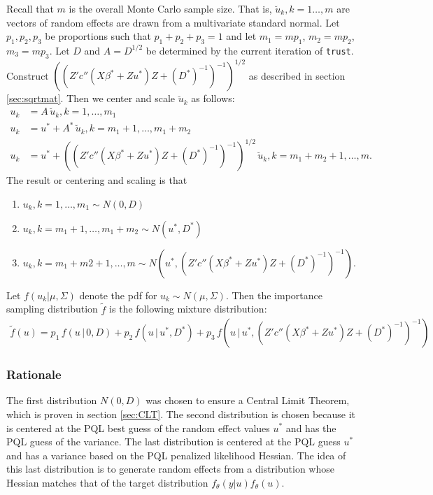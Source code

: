 \documentclass{article}
\begin{document}
 Recall that $m$ is the overall Monte Carlo sample size. That is, $\breve{u}_k,k=1\ldots,m$ are vectors of random effects are drawn from a multivariate standard normal. Let $p_1,p_2,p_3$ be proportions such that  $p_1+p_2+p_3=1$ and let $m_1=m p_1$, $m_2= m p_2$, $m_3=m p_3$. Let $D$ and $A=D^{1/2}$ be determined by the current iteration of \texttt{trust}. Construct $((Z'  c''(X \beta^*+Zu^*) Z +(D^*)^{-1}   )^{-1})^{1/2} $ as described in section \ref{sec:sqrtmat}. Then we center and scale $\breve{u}_k$ as follows:
\begin{align}
u_k&= A\, \breve{u}_k, k=1,\ldots,m_1\\
u_k&= u^*+A^* \, \breve{u}_k, k=m_1+1,\ldots,m_1+m_2\\
u_k&= u^*+ ((Z'  c''(X \beta^*+Zu^*) Z +(D^*)^{-1}   )^{-1})^{1/2} \,  \breve{u}_k, k=m_1+m_2+1,\ldots,m.
\end{align}
 The result or centering and scaling is that
\begin{enumerate}
\item $u_k,k=1,\ldots,m_1 \sim N(0,D)$
\item $u_k,k=m_1+1,\ldots,m_1+m_2 \sim N(u^*,D^*)$
\item $u_k,k=m_1+m2+1,\ldots,m \sim N(u^*,(Z'  c''(X \beta^*+Zu^*) Z +(D^*)^{-1}   )^{-1})$.
\end{enumerate}
 Let $f(u_k|\mu,\Sigma)$ denote the pdf for $u_k \sim N(\mu,\Sigma)$. Then the importance sampling distribution $\tilde{f}$ is the following mixture distribution:
\begin{align}
 \tilde{f}(u) = p_1 \,  f(u \, | \, 0, D)+p_2 \, f(u \, | \, u^*, D^*)+p_3 \, f(u \, | \, u^*, (Z'  c''(X \beta^*+Zu^*) Z +(D^*)^{-1}   )^{-1}) \label{eq:ftwiddle}
\end{align}


\subsubsection{Rationale}
The first distribution $N(0,D)$ was chosen to ensure a Central Limit Theorem, which is proven in  section \ref{sec:CLT}.   The second distribution is chosen because it is centered at the PQL best guess of the random effect values $u^*$ and  has the PQL guess of the variance. The last distribution is centered at the PQL guess $u^*$ and has a variance based on the PQL penalized likelihood Hessian.  The idea of this last distribution is to generate random effects from a distribution whose Hessian matches that of the target distribution $f_\theta(y|u) f_\theta(u)$.
\end{document}
